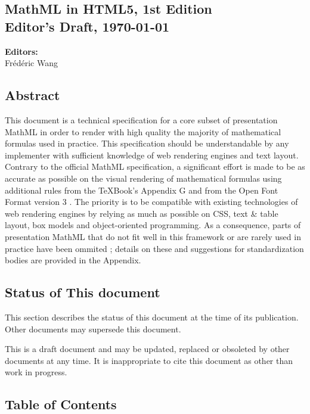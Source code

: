 \subsection*{MathML in HTML5, 1st Edition \\Editor's Draft, \today}

\textbf{Editors:} \\
Frédéric Wang

\subsection*{Abstract}

This document is a technical specification for a core subset of presentation
MathML \cite{MathML3} in order to render with high quality the majority of
mathematical formulas used in practice.
This specification should be understandable by any implementer with
sufficient knowledge of web rendering engines and text layout.
Contrary to the official MathML specification, a significant effort is made to
be as accurate as possible on the visual rendering of mathematical formulas
using additional rules from the \TeX Book's Appendix G \cite{TeXBook} and from
the Open Font Format version 3 \cite{OpenFontFormat3}.
The priority is to be compatible with existing technologies of web
rendering engines \cite{HTML5} by relying as much as possible on CSS, text \&
table layout, box models and object-oriented programming.
As a consequence, parts of presentation MathML
that do not fit well in this framework or are rarely used in practice
have been ommited ; details on these and suggestions for standardization bodies
are provided in the Appendix.

\subsection*{Status of This document}

This section describes the status of this document at the time of its
publication. Other documents may supersede this document.

This is a draft document and may be updated, replaced or obsoleted by other
documents at any time. It is inappropriate to cite this document as other than
work in progress.

\subsection*{Table of Contents}

\renewcommand\contentsname{}
\tableofcontents

